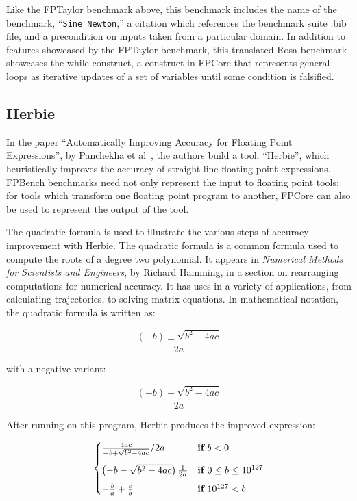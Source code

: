 \documentclass[main.tex]{subfiles}
\begin{document}
Like the FPTaylor benchmark above, this benchmark includes the name of
the benchmark, ``\verb|Sine Newton|,'' a citation which references the
benchmark suite .bib file, and a precondition on inputs taken from a
particular domain. In addition to features showcased by the FPTaylor
benchmark, this translated Rosa benchmark showcases the while
construct, a construct in FPCore that represents general loops as
iterative updates of a set of variables until some condition is
falsified.

\subsection{Herbie}

In the paper ``Automatically Improving Accuracy for Floating Point
Expressions'', by Panchekha et al~\cite{pavel15}, the authors build a
tool, ``Herbie'', which heuristically improves the accuracy of
straight-line floating point expressions. FPBench benchmarks need not
only represent the input to floating point tools; for tools which
transform one floating point program to another, FPCore can also be
used to represent the output of the tool.

The quadratic formula is used to illustrate the various steps of
accuracy improvement with Herbie. The quadratic formula is a common
formula used to compute the roots of a degree two polynomial. It
appears in \textit{Numerical Methods for Scientists and Engineers}, by
Richard Hamming, in a section on rearranging computations for
numerical accuracy. It has uses in a variety of applications, from
calculating trajectories, to solving matrix equations. In mathematical
notation, the quadratic formula is written as:

\begin{equation}
  \frac{(- b) \pm \sqrt{b^2 - 4ac}}{2a}
\end{equation}

with a negative variant:

\begin{equation}
  \frac{(- b) - \sqrt{b^2 - 4ac}}{2a}
\end{equation}

After running on this program, Herbie produces the improved
expression:

\newcommand{\K}[1]{\ensuremath{\mathbf{#1}}\relax\ifmmode\:\else\fi}

\[
\begin{cases}
  \frac{4ac}{-b + \sqrt{b^2 - 4ac}}/2a & \K{if} b < 0 \\[9pt]
  \left(-b - \sqrt{b^2 - 4ac}\right)\frac1{2a} & \K{if} 0 \le b \le 10^{127} \\[5pt]
  -\frac{b}{a} + \frac{c}{b} & \K{if} 10^{127} < b
\end{cases}
\]
\end{document}
